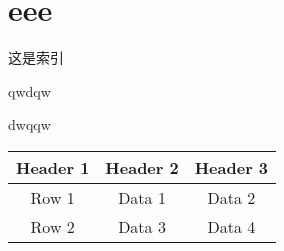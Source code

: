 


\chapter{eee}


这是索引


qwdqw

dwqqw






\begin{table}[htb]
    \centering
        \begin{tabular}{ccc}
            \toprule
                 Header 1 & Header 2 & Header 3 \\
            \midrule
                Row 1    & Data 1   & Data 2   \\
                Row 2    & Data 3   & Data 4   \\
            \bottomrule
        \end{tabular}
\end{table}